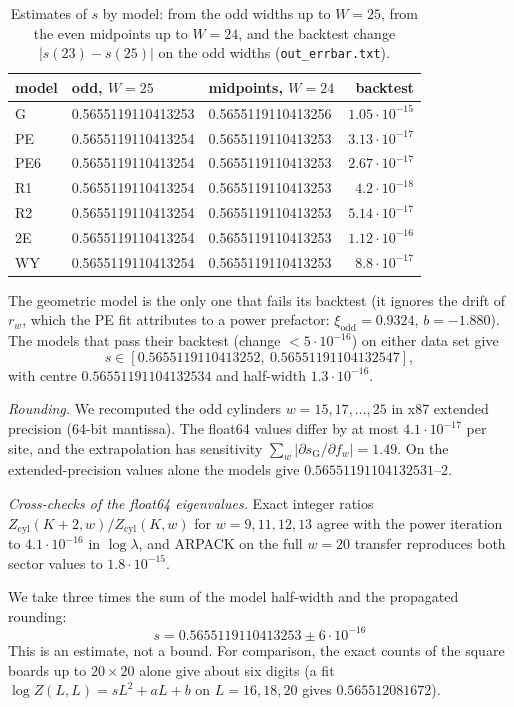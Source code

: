 \documentclass[11pt]{amsart}
\theoremstyle{definition}
\theoremstyle{remark}
\newcommand{\file}[1]{\texttt{#1}}
\begin{document}
\begin{table}[ht]
\caption{Estimates of $s$ by model: from the odd widths up to $W = 25$, from the even midpoints up
to $W = 24$, and the backtest change $|s(23) - s(25)|$ on the odd widths (\file{out\_errbar.txt}).}
\label{tab:models}
\begin{tabular}{lllr}
\toprule
model & odd, $W = 25$ & midpoints, $W = 24$ & backtest \\
\midrule
G   & 0.5655119110413253 & 0.5655119110413256 & $1.05\cdot10^{-15}$ \\
PE  & 0.5655119110413254 & 0.5655119110413253 & $3.13\cdot10^{-17}$ \\
PE6 & 0.5655119110413254 & 0.5655119110413253 & $2.67\cdot10^{-17}$ \\
R1  & 0.5655119110413254 & 0.5655119110413253 & $4.2\cdot10^{-18}$ \\
R2  & 0.5655119110413254 & 0.5655119110413253 & $5.14\cdot10^{-17}$ \\
2E  & 0.5655119110413254 & 0.5655119110413253 & $1.12\cdot10^{-16}$ \\
WY  & 0.5655119110413254 & 0.5655119110413253 & $8.8\cdot10^{-17}$ \\
\bottomrule
\end{tabular}
\end{table}

The geometric model is the only one that fails its backtest (it ignores the drift of $r_w$,
which the PE fit attributes to a power prefactor: $\xi_{\mathrm{odd}} = 0.9324$, $b = -1.880$).
The models that pass their backtest (change $< 5\cdot10^{-16}$) on either data set give
\[
  s \in [0.5655119110413252,\ 0.56551191104132547],
\]
with centre $0.56551191104132534$ and half-width $1.3\cdot10^{-16}$.

\emph{Rounding.} We recomputed the odd cylinders $w = 15, 17, \dots, 25$ in x87 extended
precision (64-bit mantissa). The float64 values differ by at most $4.1\cdot10^{-17}$ per site, and
the extrapolation has sensitivity $\sum_w |\partial s_{\mathrm G} / \partial f_w| = 1.49$. On the
extended-precision values alone the models give $0.56551191104132531$--$2$.

\emph{Cross-checks of the float64 eigenvalues.} Exact integer ratios
$Z_{\mathrm{cyl}}(K+2, w)/Z_{\mathrm{cyl}}(K, w)$ for $w = 9, 11, 12, 13$ agree with the power
iteration to $4.1\cdot10^{-16}$ in $\log \lambda$, and ARPACK on the full $w = 20$ transfer
reproduces both sector values to $1.8\cdot10^{-15}$.

We take three times the sum of the model half-width and the propagated rounding:
\[
  \boxed{\,s = 0.5655119110413253 \pm 6\cdot10^{-16}\,}
\]
This is an estimate, not a bound. For comparison, the exact counts of the square boards up to
$20\times20$ alone give about six digits (a fit $\log Z(L, L) = sL^2 + aL + b$ on $L = 16, 18, 20$
gives $0.565512081672$).
\end{document}
